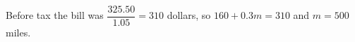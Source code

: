 Before tax the bill was $\dfrac{325.50}{1.05}=310$ dollars, so $160+0.3m=310$ and $m=\boxed{500}$ miles.
